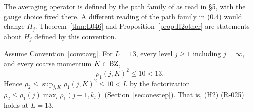\begin{convention}\label{conv:avg}
The averaging operator is defined by the path family of \cite[(0.4)]{balaban109} as read in  \S5, with the gauge choice fixed there. A different reading of the path family in (0.4) would change $H_j$. Theorem~\ref{thm:L046} and Proposition~\ref{prop:H2other} are statements about $H_j$ defined by this convention.
\end{convention}

\begin{theorem}[(H2) at $L=13$]\label{thm:L046}
Assume Convention~\ref{conv:avg}. For $L=13$, every level $j\ge1$ including $j=\infty$, and every coarse momentum $K\in\mathrm{BZ}$,
\[
\rho_1(j,K)^2\le10<13 .
\]
Hence $\rho_2\le\sup_{j,K}\rho_1(j,K)^2\le10<L$ by the factorization $\rho_2\le\rho_1(j)\max_l\rho_1(j-1,k_l)$ (Section~\ref{sec:onestep}). That is, (H2) (R-025) holds at $L=13$.
\end{theorem}

